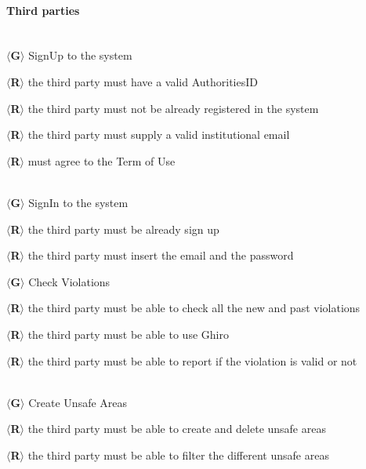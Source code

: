 \documentclass{article}
\begin{document}
\paragraph{Third parties}\mbox{}\\
$\langle$\textbf{G}$\rangle$ SignUp to the system
\begin{description}
    \item $\langle$\textbf{R}$\rangle$ the third party must have a valid
    AuthoritiesID
    \item $\langle$\textbf{R}$\rangle$ the third party must not be already
    registered  in the system
    \item $\langle$\textbf{R}$\rangle$ the third party must supply a valid
    institutional email
    \item $\langle$\textbf{R}$\rangle$ must agree to the Term of Use
\end{description}\mbox{}\\
$\langle$\textbf{G}$\rangle$ SignIn to the system
\begin{description}
    \item $\langle$\textbf{R}$\rangle$ the third party must be already sign up
    \item $\langle$\textbf{R}$\rangle$ the third party must insert the email and
    the password\\
\end{description}
$\langle$\textbf{G}$\rangle$ Check Violations
\begin{description}
    \item $\langle$\textbf{R}$\rangle$ the third party must be able to check all
    the new and past violations
    \item $\langle$\textbf{R}$\rangle$ the third party must be able to use Ghiro
    \item $\langle$\textbf{R}$\rangle$ the third party must be able to report if
the violation is valid or not \end{description}\mbox{}\\
$\langle$\textbf{G}$\rangle$ Create Unsafe Areas
\begin{description}
    \item $\langle$\textbf{R}$\rangle$ the third party must be able to create
    and delete unsafe areas
    \item $\langle$\textbf{R}$\rangle$ the third party must be able to filter
    the different unsafe areas
\end{description}    
\end{document}

